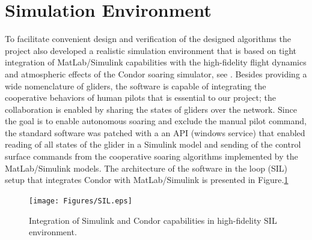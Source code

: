 \documentclass{ifacconf}
\begin{document}
\section{Simulation Environment}
\label{sec:SimEnv}
To facilitate convenient design and verification of the designed algorithms the project also developed a realistic simulation environment that is based on tight integration of MatLab/Simulink capabilities with the high-fidelity flight dynamics and atmospheric effects of the Condor soaring simulator, see \cite{Condor:2013:Online}. Besides providing a wide nomenclature of gliders, the software is capable of integrating the cooperative behaviors of human pilots that is essential to our project; the collaboration is enabled by sharing the states of gliders over the network. Since the goal is to enable autonomous soaring and exclude the manual pilot command, the standard software was patched with a an API (windows service) that enabled reading of all states of the glider in a Simulink model and sending of the control surface commands from the cooperative soaring algorithms implemented by the MatLab/Simulink models. The architecture of the software in the loop (SIL) setup that integrates Condor with MatLab/Simulink is presented in Figure.\ref{fig:SIL}

\begin{figure}[thpb]
  \centering
  \texttt{[image: Figures/SIL.eps]}
  \caption{Integration of Simulink and Condor capabilities in high-fidelity SIL environment.}
  \label{fig:SIL}
\end{figure}
\end{document}
